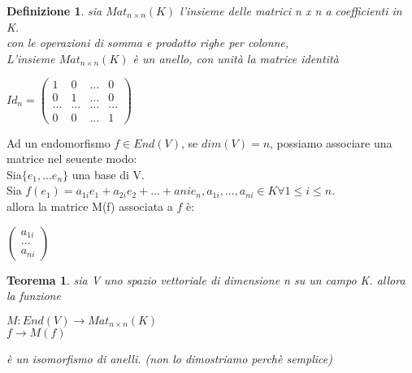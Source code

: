 \documentclass[a4paper,12pt]{article}
\theoremstyle{def}
\newtheorem*{definition}{Definizione}
\theoremstyle{prop}
\theoremstyle{esempio}
\theoremstyle{dimostrazione}
\theoremstyle{teo}
\newtheorem*{teorema}{Teorema}
\theoremstyle{osservazione}
\begin{document}
\begin{definition}
	sia \(Mat_{n \times n}(K)\) l'insieme delle matrici n x n a coefficienti in K.\\
	con le operazioni di somma e prodotto righe per colonne,\\
	L'insieme \(Mat_{n \times n}(K)\) è un anello, con unità la matrice identità
	\begin{center}
		\(Id_n = \begin{pmatrix}
			1   & 0   & ... & 0   \\
			0   & 1   & ... & 0   \\
			... & ... & ... & ... \\
			0   & 0   & ... & 1
		\end{pmatrix}\)
	\end{center}
\end{definition}

Ad un endomorfismo \(f \in End(V)\), se \(dim(V) = n\), possiamo associare una matrice nel seuente modo:\\
Sia\(\{e_1, ... e_n\}\) una base di V.\\
Sia \(f(e_1) = a_{1i} e_1 + a_{2i} e_2 + ... + a{ni} e_n, a_{1i},...,a_{ni} \in K \forall 1 \leq i \leq n\).\\
allora la matrice M(f) associata a \(f\) è:
\begin{center}
	\(\begin{pmatrix}
		a_{1i} \\
		...    \\
		a_{ni}
	\end{pmatrix}\)
\end{center}

\begin{teorema}
	sia V uno spazio vettoriale di dimensione n su un campo K. allora la funzione
	\begin{center}
		\(M: End(V) \rightarrow Mat_{n \times n}(K)\)\\
		\(f \rightarrow M(f)\)
	\end{center}
	è un isomorfismo di anelli. (non lo dimostriamo perchè semplice)
\end{teorema}
\end{document}
